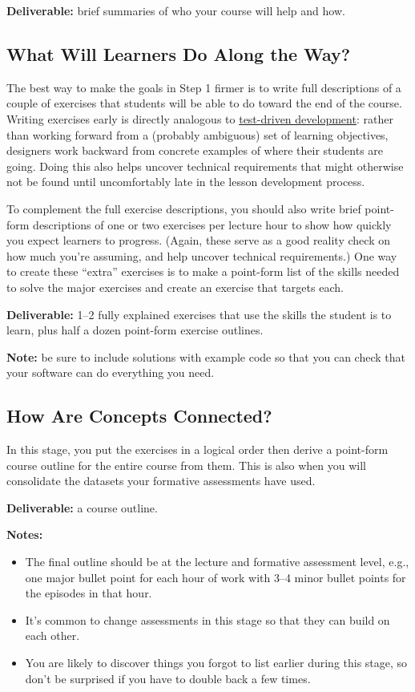 \textbf{Deliverable:} brief summaries of who your course will help and how.

\subsection{What Will Learners Do Along the Way?}

The best way to make the goals in Step 1 firmer is to write full
descriptions of a couple of exercises that students will be able to do
toward the end of the course. Writing exercises early is directly
analogous to \href{https://en.wikipedia.org/wiki/Test-driven\_development}{test-driven development}: rather than working
forward from a (probably ambiguous) set of learning objectives,
designers work backward from concrete examples of where their students
are going. Doing this also helps uncover technical requirements that
might otherwise not be found until uncomfortably late in the lesson
development process.

To complement the full exercise descriptions, you should also write
brief point-form descriptions of one or two exercises per lecture hour
to show how quickly you expect learners to progress. (Again, these serve
as a good reality check on how much you're assuming, and help uncover
technical requirements.) One way to create these ``extra'' exercises is to
make a point-form list of the skills needed to solve the major exercises
and create an exercise that targets each.

\textbf{Deliverable:} 1--2 fully explained exercises that use the skills the
student is to learn, plus half a dozen point-form exercise outlines.

\textbf{Note:} be sure to include solutions with example code so that you can
check that your software can do everything you need.

\subsection{How Are Concepts Connected?}

In this stage, you put the exercises in a logical order then derive a
point-form course outline for the entire course from them. This is also
when you will consolidate the datasets your formative assessments have
used.

\textbf{Deliverable:} a course outline.

\textbf{Notes:}

\begin{itemize}
\item
  The final outline should be at the lecture and formative assessment
  level, e.g., one major bullet point for each hour of work with 3--4
  minor bullet points for the episodes in that hour.
\item
  It's common to change assessments in this stage so that they can
  build on each other.
\item
  You are likely to discover things you forgot to list earlier during
  this stage, so don't be surprised if you have to double back a few
  times.
\end{itemize}

